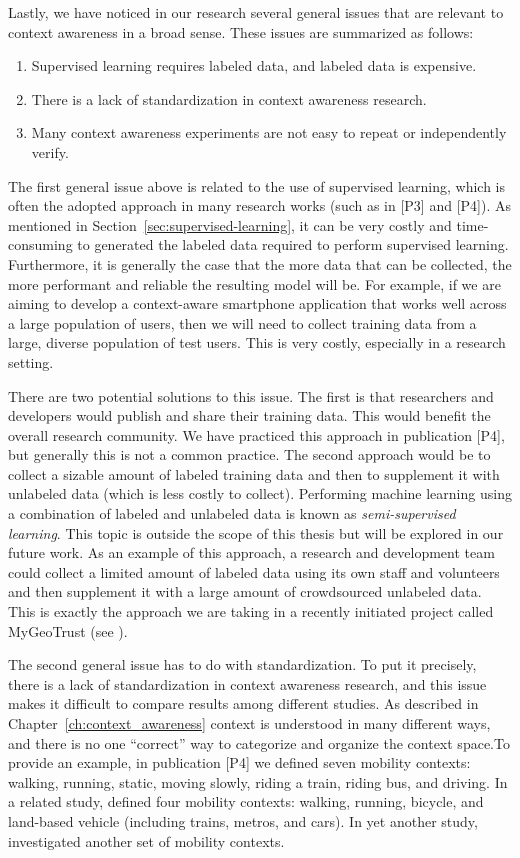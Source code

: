 Lastly, we have noticed in our research several general issues that are relevant to context awareness in a broad sense. These issues are summarized as follows:
%
\begin{enumerate}
 \item Supervised learning requires labeled data, and labeled data is expensive.
 \item There is a lack of standardization in context awareness research.
 \item Many context awareness experiments are not easy to repeat or independently verify.
\end{enumerate}


The first general issue above is related to the use of supervised learning, which is often the adopted approach in many research works (such as in [P3] and [P4]). As mentioned in Section~\ref{sec:supervised-learning}, it can be very costly and time-consuming to generated the labeled data required to perform supervised learning. Furthermore, it is generally the case that the more data that can be collected, the more performant and reliable the resulting model will be. For example, if we are aiming to develop a context-aware smartphone application that works well across a large population of users, then we will need to collect training data from a large, diverse population of test users. This is very costly, especially in a research setting.

There are two potential solutions to this issue. The first is that researchers and developers would publish and share their training data. This would benefit the overall research community. We have practiced this approach in publication [P4], but generally this is not a common practice. The second approach would be to collect a sizable amount of labeled training data and then to supplement it with unlabeled data (which is less costly to collect). Performing machine learning using a combination of labeled and unlabeled data is known as \emph{semi-supervised learning}. This topic is outside the scope of this thesis but will be explored in our future work. As an example of this approach, a research and development team could collect a limited amount of labeled data using its own staff and volunteers and then supplement it with a large amount of crowdsourced unlabeled data. This is exactly the approach we are taking in a recently initiated project called MyGeoTrust (see \cite{Guinness2015}).

The second general issue has to do with standardization. To put it precisely, there is a lack of standardization in context awareness research, and this issue makes it difficult to compare results among different studies. As described in Chapter~\ref{ch:context_awareness} context is understood in many different ways, and there is no one ``correct'' way to categorize and organize the context space.To provide an example, in publication [P4] we defined seven mobility contexts: walking, running, static, moving slowly, riding a train, riding bus, and driving. In a related study, \cite{elhoushi2014robust} defined four mobility contexts: walking, running, bicycle, and land-based vehicle (including trains, metros, and cars). In yet another study, \cite{stenneth2013detecting} investigated another set of mobility contexts.

